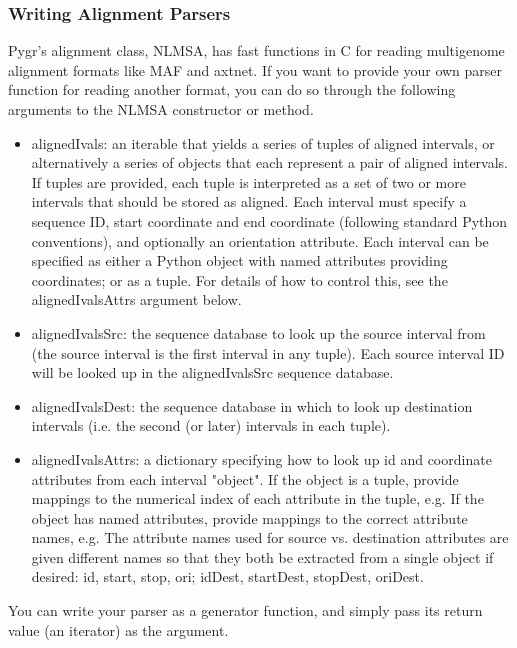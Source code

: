 \documentclass{howto}
\begin{document}
\begin{itemize}
\subsubsection{Writing Alignment Parsers}
Pygr's alignment class, NLMSA, has fast functions in C for reading 
multigenome alignment formats like MAF and axtnet.  If you want to
provide your own parser function for reading another format, you can
do so through the following arguments to the NLMSA constructor or
 method.
\begin{itemize}
\item alignedIvals: an iterable that yields a series of tuples
of aligned intervals, or alternatively a series of objects
that each represent a pair of aligned intervals.  
If tuples are provided, each tuple is interpreted as a set of two
or more intervals that should be stored as aligned.  Each interval
must specify a sequence ID, start coordinate and end coordinate
(following standard Python conventions), and optionally an
orientation attribute.  Each interval
can be specified as either a Python object with named attributes
providing coordinates; or as a tuple.  For details of how to 
control this, see the alignedIvalsAttrs argument below.

\item alignedIvalsSrc: the sequence database to look up the source
interval from (the source interval is the first interval in any tuple).
Each source interval ID will be looked up in the alignedIvalsSrc
sequence database.

\item alignedIvalsDest: the sequence database in which to look up destination
intervals (i.e. the second (or later) intervals in each tuple).

\item alignedIvalsAttrs: a dictionary specifying how to look up
id and coordinate attributes from each interval "object".  If
the object is a tuple, provide mappings to the numerical index
of each attribute in the tuple, e.g.
If the object has named attributes, provide mappings to the correct
attribute names, e.g.
The attribute names used for source vs. destination attributes are
given different names so that they both be extracted from a single
object if desired: id, start, stop, ori; idDest, startDest, stopDest, oriDest.
\end{itemize}
You can write your parser as a generator function, and simply pass its
return value (an iterator) as the  argument.


\end{itemize}
\end{document}
